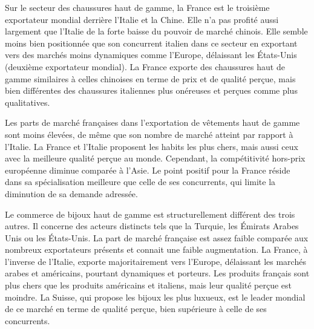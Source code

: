 \documentclass[french,10pt,a4paper]{article}
\begin{document}
\bigskip

Sur le secteur des chaussures haut de gamme, la France est le troisième exportateur mondial derrière l'Italie et la Chine. Elle n'a pas profité aussi largement que l'Italie de la forte baisse du pouvoir de marché chinois. Elle semble moins bien positionnée que son concurrent italien dans ce secteur en exportant vers des marchés moins dynamiques comme l'Europe, délaissant les États-Unis (deuxième exportateur mondial). La France exporte des chaussures haut de gamme similaires à celles chinoises en terme de prix et de qualité perçue, mais bien différentes des chaussures italiennes plus onéreuses et perçues comme plus qualitatives.

\bigskip
Les parts de marché françaises dans l'exportation de vêtements haut de gamme sont moins élevées, de même que son nombre de marché atteint par rapport à l'Italie. La France et l'Italie proposent les habits les plus chers, mais aussi ceux avec la meilleure qualité perçue au monde. Cependant, la compétitivité hors-prix européenne diminue comparée à l'Asie. Le point positif pour la France réside dans sa spécialisation meilleure que celle de ses concurrents, qui limite la diminution de sa demande adressée.

\bigskip

Le commerce de bijoux haut de gamme est structurellement différent des trois autres. Il concerne des acteurs distincts tels que la Turquie, les Émirats Arabes Unis ou les États-Unis. La part de marché française est assez faible comparée aux nombreux exportateurs présents et connait une faible augmentation. La France, à l'inverse de l'Italie, exporte majoritairement vers l'Europe, délaissant les marchés arabes et américains, pourtant dynamiques et porteurs. Les produits français sont plus chers que les produits américains et italiens, mais leur qualité perçue est moindre. La Suisse, qui propose les bijoux les plus luxueux, est le leader mondial de ce marché en terme de qualité perçue, bien supérieure à celle de ses concurrents.



\newpage

% 



\newpage
\end{document}
